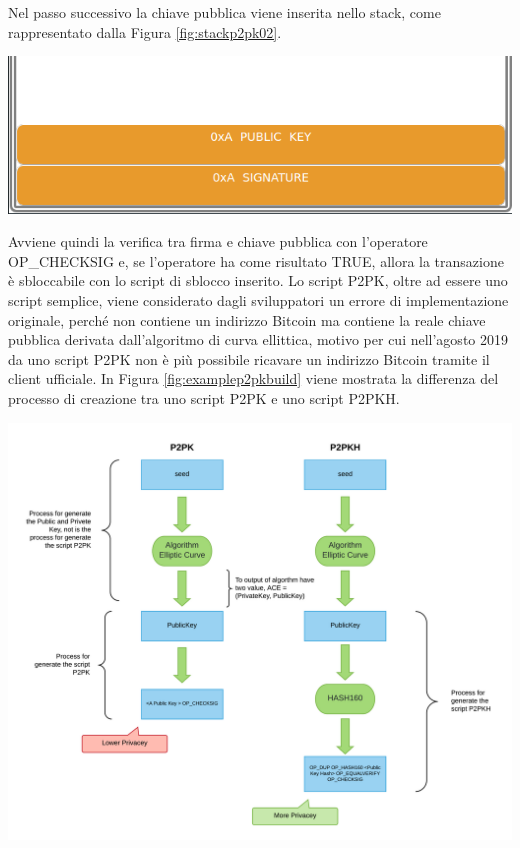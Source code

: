 Nel passo successivo la chiave pubblica viene inserita nello stack, come rappresentato dalla Figura \ref{fig:stackp2pk02}.

{\centering
\vspace{10pt}
\includegraphics[scale=0.35]{images/script/p2pk/2.png}
\vspace{10pt}
\par}

Avviene quindi la verifica tra firma e chiave pubblica con l’operatore OP\_CHECKSIG e, se  l’operatore ha come risultato TRUE, allora la transazione è sbloccabile con lo script di sblocco inserito.\newline
Lo script P2PK, oltre ad essere uno script semplice, viene considerato dagli sviluppatori un errore di implementazione originale, perché non contiene un indirizzo Bitcoin ma contiene la reale chiave pubblica derivata dall’algoritmo di curva ellittica, motivo per cui nell'agosto 2019 da uno script P2PK non è più possibile ricavare un indirizzo Bitcoin tramite il client ufficiale. In Figura \ref{fig:examplep2pkbuild} viene mostrata la differenza del processo di creazione tra uno script P2PK e uno script P2PKH.

{\centering
\includegraphics[scale=0.10]{images/proccessBuildP2PK.png}
\par}

